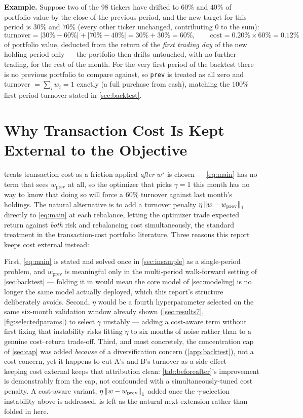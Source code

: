 \textbf{Example.} Suppose two of the 98 tickers have drifted to $60\%$ and $40\%$ of portfolio
value by the close of the previous period, and the new target for this period is $30\%$ and
$70\%$ (every other ticker unchanged, contributing $0$ to the sum):
\begin{equation}
\text{turnover} = |30\%-60\%| + |70\%-40\%| = 30\% + 30\% = 60\%,
\qquad
\text{cost} = 0.20\% \times 60\% = 0.12\%
\end{equation}
of portfolio value, deducted from the return of the \emph{first trading day} of the new holding
period only --- the portfolio then drifts untouched, with no further trading, for the rest of
the month. For the very first period of the backtest there is no previous portfolio to compare
against, so \texttt{prev} is treated as all zero and turnover $= \sum_i w_i = 1$ exactly (a full
purchase from cash), matching the $100\%$ first-period turnover stated in \cref{sec:backtest}.

\section{Why Transaction Cost Is Kept External to the Objective}\label{app:turnover-design}

 treats transaction cost as a friction applied \emph{after} $w^\star$ is
chosen --- \cref{eq:main} has no term that sees $w_{\text{prev}}$ at all, so the optimizer that
picks $\gamma=1$ this month has no way to know that doing so will force a $60\%$ turnover against
last month's holdings. The natural alternative is to add a turnover penalty
$\eta\left\lVert w-w_{\text{prev}} \right\rVert_1$ directly to \cref{eq:main} at each rebalance, letting the
optimizer trade expected return against \emph{both} risk and rebalancing cost simultaneously,
the standard treatment in the transaction-cost portfolio literature. Three reasons this report
keeps cost external instead:

First, \cref{eq:main} is stated and solved once in \cref{sec:insample} as a single-period
problem, and $w_{\text{prev}}$ is meaningful only in the multi-period walk-forward setting of
\cref{sec:backtest} --- folding it in would mean the core model of \cref{sec:modeling} is no
longer the same model actually deployed, which this report's structure deliberately avoids.
Second, $\eta$ would be a fourth hyperparameter selected on the same six-month validation window
already shown (\cref{sec:results7}, \cref{fig:selectedparams}) to select $\gamma$ unstably ---
adding a cost-aware term without first fixing that instability risks fitting $\eta$ to six months
of noise rather than to a genuine cost--return trade-off. Third, and most concretely, the
concentration cap of \cref{sec:cap} was added \emph{because} of a diversification concern
(\cref{app:backtest}), not a cost concern, yet it happens to cut A's and B's turnover as a side
effect --- keeping cost external keeps that attribution clean: \cref{tab:beforeafter}'s
improvement is demonstrably from the cap, not confounded with a simultaneously-tuned cost
penalty. A cost-aware variant, $\eta\left\lVert w-w_{\text{prev}} \right\rVert_1$ added once the $\gamma$-selection
instability above is addressed, is left as the natural next extension rather than folded in here.

